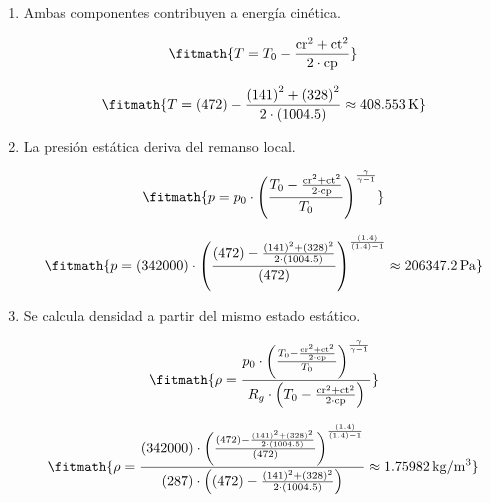 \begin{enumerate}

\item Ambas componentes contribuyen a energía cinética.

\[\fitmath{T=T_0-\frac{{\mathrm{cr}}^{2}+{\mathrm{ct}}^{2}}{2\cdot \mathrm{cp}}}\]

\[\fitmath{T=(472)-\frac{{(141)}^{2}+{(328)}^{2}}{2\cdot (1004.5)}\approx 408.553\,\mathrm{K}}\]

\item La presión estática deriva del remanso local.

\[\fitmath{p=p_0\cdot {\left(\frac{T_0-\frac{{\mathrm{cr}}^{2}+{\mathrm{ct}}^{2}}{2\cdot \mathrm{cp}}}{T_0}\right)}^{\frac{\gamma}{\gamma-1}}}\]

\[\fitmath{p=(342000)\cdot {\left(\frac{(472)-\frac{{(141)}^{2}+{(328)}^{2}}{2\cdot (1004.5)}}{(472)}\right)}^{\frac{(1.4)}{(1.4)-1}}\approx 206347.2\,\mathrm{Pa}}\]

\item Se calcula densidad a partir del mismo estado estático.

\[\fitmath{\rho=\frac{p_0\cdot {\left(\frac{T_0-\frac{{\mathrm{cr}}^{2}+{\mathrm{ct}}^{2}}{2\cdot \mathrm{cp}}}{T_0}\right)}^{\frac{\gamma}{\gamma-1}}}{R_g\cdot \left(T_0-\frac{{\mathrm{cr}}^{2}+{\mathrm{ct}}^{2}}{2\cdot \mathrm{cp}}\right)}}\]

\[\fitmath{\rho=\frac{(342000)\cdot {\left(\frac{(472)-\frac{{(141)}^{2}+{(328)}^{2}}{2\cdot (1004.5)}}{(472)}\right)}^{\frac{(1.4)}{(1.4)-1}}}{(287)\cdot \left((472)-\frac{{(141)}^{2}+{(328)}^{2}}{2\cdot (1004.5)}\right)}\approx 1.75982\,\mathrm{kg/m^{3}}}\]

\end{enumerate}
